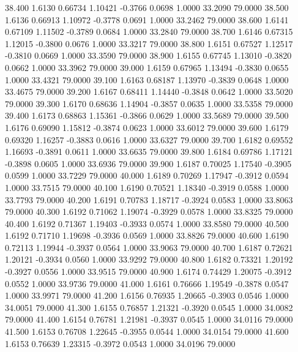   38.400   1.6130   0.66734   1.10421  -0.3766   0.0698   1.0000  33.2090  79.0000
  38.500   1.6136   0.66913   1.10972  -0.3778   0.0691   1.0000  33.2462  79.0000
  38.600   1.6141   0.67109   1.11502  -0.3789   0.0684   1.0000  33.2840  79.0000
  38.700   1.6146   0.67315   1.12015  -0.3800   0.0676   1.0000  33.3217  79.0000
  38.800   1.6151   0.67527   1.12517  -0.3810   0.0669   1.0000  33.3590  79.0000
  38.900   1.6155   0.67745   1.13010  -0.3820   0.0662   1.0000  33.3962  79.0000
  39.000   1.6159   0.67965   1.13494  -0.3830   0.0655   1.0000  33.4321  79.0000
  39.100   1.6163   0.68187   1.13970  -0.3839   0.0648   1.0000  33.4675  79.0000
  39.200   1.6167   0.68411   1.14440  -0.3848   0.0642   1.0000  33.5020  79.0000
  39.300   1.6170   0.68636   1.14904  -0.3857   0.0635   1.0000  33.5358  79.0000
  39.400   1.6173   0.68863   1.15361  -0.3866   0.0629   1.0000  33.5689  79.0000
  39.500   1.6176   0.69090   1.15812  -0.3874   0.0623   1.0000  33.6012  79.0000
  39.600   1.6179   0.69320   1.16257  -0.3883   0.0616   1.0000  33.6327  79.0000
  39.700   1.6182   0.69552   1.16693  -0.3891   0.0611   1.0000  33.6635  79.0000
  39.800   1.6184   0.69786   1.17121  -0.3898   0.0605   1.0000  33.6936  79.0000
  39.900   1.6187   0.70025   1.17540  -0.3905   0.0599   1.0000  33.7229  79.0000
  40.000   1.6189   0.70269   1.17947  -0.3912   0.0594   1.0000  33.7515  79.0000
  40.100   1.6190   0.70521   1.18340  -0.3919   0.0588   1.0000  33.7793  79.0000
  40.200   1.6191   0.70783   1.18717  -0.3924   0.0583   1.0000  33.8063  79.0000
  40.300   1.6192   0.71062   1.19074  -0.3929   0.0578   1.0000  33.8325  79.0000
  40.400   1.6192   0.71367   1.19403  -0.3933   0.0574   1.0000  33.8580  79.0000
  40.500   1.6192   0.71710   1.19698  -0.3936   0.0569   1.0000  33.8826  79.0000
  40.600   1.6190   0.72113   1.19944  -0.3937   0.0564   1.0000  33.9063  79.0000
  40.700   1.6187   0.72621   1.20121  -0.3934   0.0560   1.0000  33.9292  79.0000
  40.800   1.6182   0.73321   1.20192  -0.3927   0.0556   1.0000  33.9515  79.0000
  40.900   1.6174   0.74429   1.20075  -0.3912   0.0552   1.0000  33.9736  79.0000
  41.000   1.6161   0.76666   1.19549  -0.3878   0.0547   1.0000  33.9971  79.0000
  41.200   1.6156   0.76935   1.20665  -0.3903   0.0546   1.0000  34.0051  79.0000
  41.300   1.6155   0.76857   1.21321  -0.3920   0.0545   1.0000  34.0082  79.0000
  41.400   1.6154   0.76781   1.21981  -0.3937   0.0545   1.0000  34.0116  79.0000
  41.500   1.6153   0.76708   1.22645  -0.3955   0.0544   1.0000  34.0154  79.0000
  41.600   1.6153   0.76639   1.23315  -0.3972   0.0543   1.0000  34.0196  79.0000
